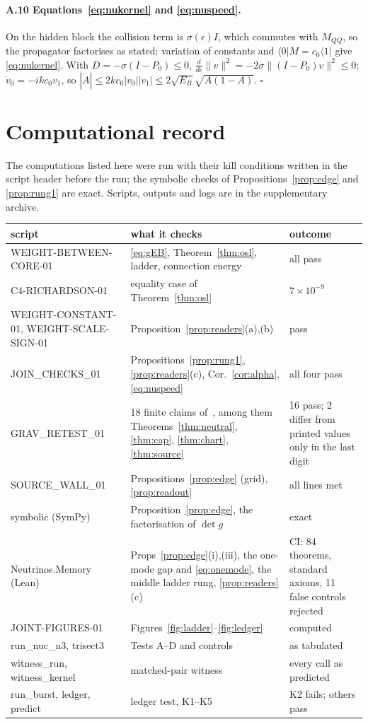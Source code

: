\documentclass[11pt]{article}
\theoremstyle{definition}
\begin{document}
\paragraph{A.10 Equations~\eqref{eq:nukernel} and \eqref{eq:nuspeed}.} On the hidden block the collision term is $\sigma(\epsilon)I$, which commutes with $M_{QQ}$, so the propagator factorises as stated; variation of constants and $\langle0|M=c_0\langle1|$ give \eqref{eq:nukernel}. With $D=-\sigma(I-P_0)\le0$, $\frac d{d\epsilon}\lVert v\rVert^2=-2\sigma\lVert(I-P_0)v\rVert^2\le0$; $\dot v_0=-ikc_0v_1$, so $|\dot A|\le2kc_0|v_0||v_1|\le2\sqrt{E_B}\sqrt{A(1-A)}$. $\square$

\section{Computational record}

The computations listed here were run with their kill conditions written in the script header before the run; the symbolic checks of Propositions~\ref{prop:edge} and \ref{prop:rung1} are exact. Scripts, outputs and logs are in the supplementary archive.

\begin{center}\small\begin{tabular}{p{4.6cm}p{6.6cm}p{3.6cm}}\toprule
script & what it checks & outcome\\\midrule
WEIGHT-BETWEEN-CORE-01 & \eqref{eq:gEB}, Theorem~\ref{thm:osl}, ladder, connection energy & all pass~\cite{WB,OSL}\\
C4-RICHARDSON-01 & equality case of Theorem~\ref{thm:osl} & $7\times10^{-9}$\\
WEIGHT-CONSTANT-01, WEIGHT-SCALE-SIGN-01 & Proposition~\ref{prop:readers}(a),(b) & pass\\
JOIN\_CHECKS\_01 & Propositions~\ref{prop:rung1}, \ref{prop:readers}(c), Cor.~\ref{cor:alpha}, \eqref{eq:nuspeed} & all four pass\\
GRAV\_RETEST\_01 & 18 finite claims of~\cite{GLO}, among them Theorems~\ref{thm:neutral}, \ref{thm:cap}, \ref{thm:chart}, \ref{thm:source} & 16 pass; 2 differ from printed values only in the last digit\\
SOURCE\_WALL\_01 & Propositions~\ref{prop:edge} (grid), \ref{prop:readout} & all lines met\\
symbolic (SymPy) & Proposition~\ref{prop:edge}, the factorisation of $\det g$ & exact\\
Neutrinos.Memory (Lean) & Props~\ref{prop:edge}(i),(iii), the one-mode gap and \eqref{eq:onemode}, the middle ladder rung, \ref{prop:readers}(c) & CI: 84 theorems, standard axioms, 11 false controls rejected\\
JOINT-FIGURES-01 & Figures~\ref{fig:ladder}--\ref{fig:ledger} & computed\\
run\_nuc\_n3, trisect3 & Tests A--D and controls & as tabulated~\cite{NL}\\
witness\_run, witness\_kernel & matched-pair witness & every call as predicted\\
run\_burst, ledger, predict & ledger test, K1--K5 & K2 fails; others pass\\\bottomrule
\end{tabular}\end{center}
\end{document}
